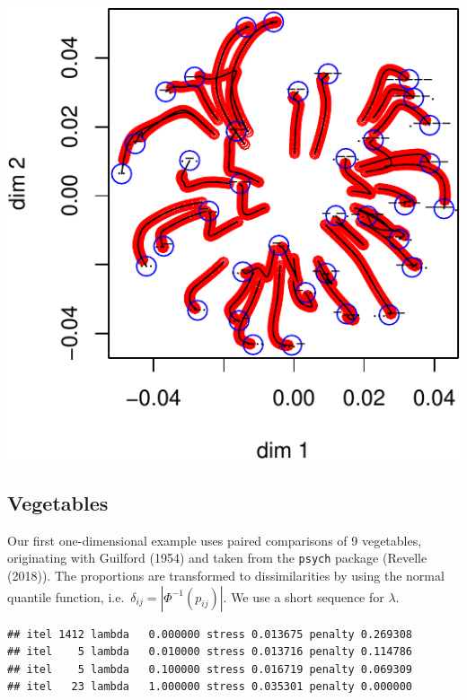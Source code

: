\documentclass[
  12pt,
]{article}
\begin{document}
\begin{center}\includegraphics{penalty_files/figure-latex/morse-1} \end{center}

\hypertarget{vegetables}{%
\subsection{Vegetables}\label{vegetables}}

Our first one-dimensional example uses paired comparisons of 9
vegetables, originating with Guilford (1954) and taken from the
\texttt{psych} package (Revelle (2018)). The proportions are transformed
to dissimilarities by using the normal quantile function,
i.e.~\(\delta_{ij}=|\Phi^{-1}(p_{ij})|\). We use a short sequence for
\(\lambda\).

\begin{verbatim}
## itel 1412 lambda   0.000000 stress 0.013675 penalty 0.269308 
## itel    5 lambda   0.010000 stress 0.013716 penalty 0.114786 
## itel    5 lambda   0.100000 stress 0.016719 penalty 0.069309 
## itel   23 lambda   1.000000 stress 0.035301 penalty 0.000000
\end{verbatim}
\end{document}
